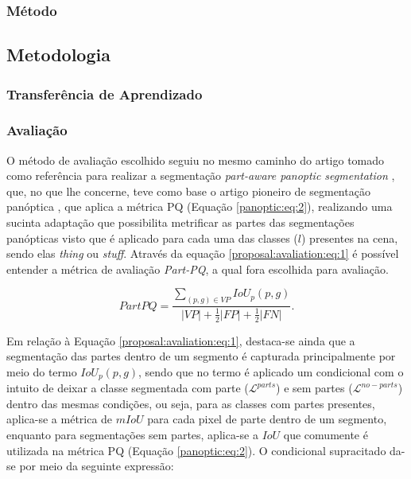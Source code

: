\subsubsection{Método}
\label{proposal:method}

\subsection{Metodologia}
\label{proposal:methodology}

\subsubsection{Transferência de Aprendizado}
\label{proposal:transf}

\subsubsection{Avaliação}
\label{proposal:avaliation}

O método de avaliação escolhido seguiu no mesmo caminho do artigo tomado como referência para realizar a segmentação \textit{part-aware panoptic segmentation} \cite{DeGeus2021}, que, no que lhe concerne, teve como base o artigo pioneiro de segmentação panóptica \cite{Kirillov2019a}, que aplica a métrica PQ (Equação \ref{panoptic:eq:2}), realizando uma sucinta adaptação que possibilita metrificar as partes das segmentações panópticas visto que é aplicado para cada uma das classes ($l$) presentes na cena, sendo elas \textit{thing} ou \textit{stuff}. Através da equação \ref{proposal:avaliation:eq:1} é possível entender a métrica de avaliação \textit{Part-PQ}, a qual fora escolhida para avaliação.

\begin{equation}
\label{proposal:avaliation:eq:1}
    PartPQ = \frac{\sum _{(p,g) \in VP} IoU_p(p,g)}{|VP|+ \frac{1}{2}|FP| + \frac{1}{2}|FN|}.
\end{equation}

Em relação à Equação \ref{proposal:avaliation:eq:1}, destaca-se ainda que a segmentação das partes dentro de um segmento é capturada principalmente por meio do termo $IoU_p(p,g)$, sendo que no termo é aplicado um condicional com o intuito de deixar a classe segmentada com parte ($\mathcal{L}^{parts}$) e sem partes ($\mathcal{L}^{no-parts}$) dentro das mesmas condições, ou seja, para as classes com partes presentes, aplica-se a métrica de $mIoU$ para cada pixel de parte dentro de um segmento, enquanto para segmentações sem partes, aplica-se a $IoU$ que comumente é utilizada na métrica PQ (Equação \ref{panoptic:eq:2}). O condicional supracitado da-se por meio da seguinte expressão:

